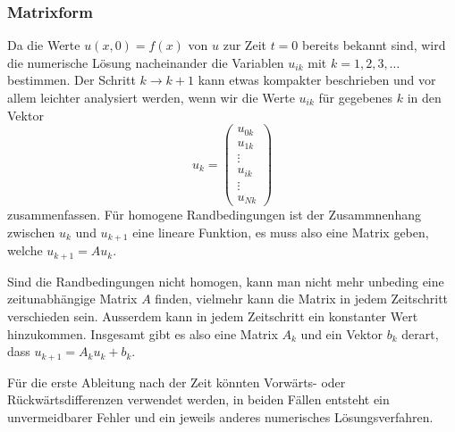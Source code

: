 \subsubsection{Matrixform}
Da die Werte $u(x,0)=f(x)$ von $u$ zur Zeit $t=0$ bereits bekannt
sind, wird die numerische Lösung nacheinander die Variablen
$u_{ik}$ mit $k=1,2,3,\dots$ bestimmen.
Der Schritt $k\to k+1$ kann etwas kompakter beschrieben und vor allem
leichter analysiert werden, wenn wir die Werte $u_{ik}$ für gegebenes $k$
in den Vektor
\[
u_k = \begin{pmatrix}
u_{0k}\\
u_{1k}\\
\vdots\\
u_{ik}\\
\vdots\\
u_{Nk}
\end{pmatrix}
\]
zusammenfassen.
Für homogene Randbedingungen ist der Zusammnenhang zwischen $u_k$
und $u_{k+1}$ eine lineare Funktion, es muss also eine Matrix geben,
welche $u_{k+1}=Au_k$.

Sind die Randbedingungen nicht homogen, kann man nicht mehr unbeding
eine zeitunabhängige Matrix $A$ finden, vielmehr kann die Matrix
in jedem Zeitschritt verschieden sein.
Ausserdem kann in jedem Zeitschritt ein konstanter Wert hinzukommen.
Insgesamt gibt es also eine Matrix $A_k$ und ein Vektor $b_k$ derart,
dass $u_{k+1} = A_ku_k + b_k$.


Für die erste Ableitung nach der Zeit könnten Vorwärts- oder
Rückwärtsdifferenzen verwendet werden, in beiden Fällen entsteht
ein unvermeidbarer Fehler und ein jeweils anderes numerisches
Lösungsverfahren.

